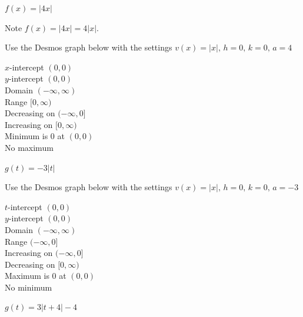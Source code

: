 \documentclass{ximera}
\begin{document}
\begin{question}
\begin{problem}
\begin{solution}
\end{solution}
\end{problem}

\begin{problem}
$f(x) = |4x|$

\begin{solution}
Note $f(x) = |4x| = 4|x|$.

Use the Desmos graph below with the settings $v(x)=|x|,\,h=0,\,k=0,\,a=4$

\begin{center} 
\end{center}

$x$-intercept $(0, 0)$ \\ $y$-intercept $(0, 0)$ \\ Domain $(-\infty, \infty)$ \\ Range $[0, \infty)$ \\ Decreasing on $(-\infty, 0]$ \\ Increasing on $[0, \infty)$ \\ Minimum is $0$ at $(0,0)$  \\ No maximum \\
\end{solution}
\end{problem}

\begin{problem}
$g(t) = -3|t|$ 

\begin{solution}
Use the Desmos graph below with the settings $v(x)=|x|,\,h=0,\,k=0,\,a=-3$

\begin{center} 
\end{center}

$t$-intercept $(0, 0)$ \\ $y$-intercept $(0, 0)$ \\ Domain $(-\infty, \infty)$ \\ Range $(-\infty, 0]$ \\ Increasing on $(-\infty, 0]$ \\ Decreasing on $[0, \infty)$ \\ Maximum is $0$ at $(0, 0)$ \\ No minimum \\
\end{solution}
\end{problem}

\begin{problem}
$g(t) = 3|t + 4| - 4$


\end{problem}
\end{question}
\end{document}
